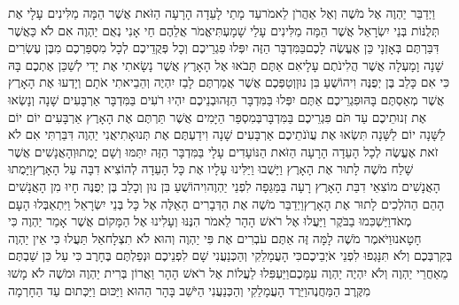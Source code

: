 \documentclass[../main/main.tex]{subfiles}
\begin{document}
\begin{multicols}{\ncols}
וַיְדַבֵּר יַהְוֶה אֶל מֹשֶׁה וְאֶל אַהֲרֹן לֵאמֹר\PreVerseSpace{}עַד מָתַי לָעֵדָה הָרָעָה הַזֹּאת אֲשֶׁר הֵמָּה מַלִּינִים עָלָי אֶת תְּלֻנּוֹת בְּנֵי יִשְׂרָאֵל אֲשֶׁר הֵמָּה מַלִּינִים עָלַי שָׁמָעְתִּי\PreVerseSpace{}אֱמֹר אֲלֵהֶם חַי אָנִי נְאֻם יַהְוֶה אִם לֹא כַּאֲשֶׁר דִּבַּרְתֶּם בְּאָזְנָי כֵּן אֶעֱשֶׂה לָכֶם\PreVerseSpace{}בַּמִּדְבָּר הַזֶּה יִפְּלוּ פִגְרֵיכֶם וְכָל פְּקֻדֵיכֶם לְכָל מִסְפַּרְכֶם מִבֶּן עֶשְׂרִים שָׁנָה וָמָעְלָה אֲשֶׁר הֲלִינֹתֶם עָלָי\PreVerseSpace{}אִם אַתֶּם תָּבֹאוּ אֶל הָאָרֶץ אֲשֶׁר נָשָׂאתִי אֶת יָדִי לְשַׁכֵּן אֶתְכֶם בָּהּ כִּי אִם כָּלֵב בֶּן יְפֻנֶּה וִיהוֹשֻׁעַ בִּן נוּן\PreVerseSpace{}וְטַפְּכֶם אֲשֶׁר אֲמַרְתֶּם לָבַז יִהְיֶה וְהֵבֵיאתִי אֹתָם וְיָדְעוּ אֶת הָאָרֶץ אֲשֶׁר מְאַסְתֶּם בָּהּ\PreVerseSpace{}וּפִגְרֵיכֶם אַתֶּם יִפְּלוּ בַּמִּדְבָּר הַזֶּה\PreVerseSpace{}וּבְנֵיכֶם יִהְיוּ רֹעִים בַּמִּדְבָּר אַרְבָּעִים שָׁנָה וְנָשְׂאוּ אֶת זְנוּתֵיכֶם עַד תֹּם פִּגְרֵיכֶם בַּמִּדְבָּר\PreVerseSpace{}בְּמִסְפַּר הַיָּמִים אֲשֶׁר תַּרְתֶּם אֶת הָאָרֶץ אַרְבָּעִים יוֹם יוֹם לַשָּׁנָה יוֹם לַשָּׁנָה תִּשְׂאוּ אֶת עֲוֺנֹתֵיכֶם אַרְבָּעִים שָׁנָה וִידַעְתֶּם אֶת תְּנוּאָתִי\PreVerseSpace{}אֲנִי יַהְוֶה דִּבַּרְתִּי אִם לֹא זֹאת אֶעֱשֶׂה לְכָל הָעֵדָה הָרָעָה הַזֹּאת הַנּוֹעָדִים עָלָי בַּמִּדְבָּר הַזֶּה יִתַּמּוּ וְשָׁם יָמֻתוּ\PreVerseSpace{}וְהָאֲנָשִׁים אֲשֶׁר שָׁלַח מֹשֶׁה לָתוּר אֶת הָאָרֶץ וַיָּשֻׁבוּ וַיַּלִּינוּ\SubEnd{} עָלָיו אֶת כָּל הָעֵדָה לְהוֹצִיא דִבָּה עַל הָאָרֶץ\PreVerseSpace{}וַיָּמֻתוּ הָאֲנָשִׁים מוֹצִאֵי דִבַּת הָאָרֶץ רָעָה בַּמַּגֵּפָה לִפְנֵי יַהְוֶה\PreVerseSpace{}וִיהוֹשֻׁעַ בִּן נוּן וְכָלֵב בֶּן יְפֻנֶּה חָיוּ מִן הָאֲנָשִׁים הָהֵם הַהֹלְכִים לָתוּר אֶת הָאָרֶץ\PreVerseSpace{}וַיְדַבֵּר מֹשֶׁה אֶת הַדְּבָרִים הָאֵלֶּה אֶל כָּל בְּנֵי יִשְׂרָאֵל וַיִּתְאַבְּלוּ הָעָם מְאֹד\PreVerseSpace{}וַיַּשְׁכִּמוּ בַבֹּקֶר וַיַּעֲלוּ אֶל רֹאשׁ הָהָר לֵאמֹר הִנֶּנּוּ וְעָלִינוּ אֶל הַמָּקוֹם אֲשֶׁר אָמַר יַהְוֶה כִּי חָטָאנוּ\PreVerseSpace{}וַיֹּאמֶר מֹשֶׁה לָמָּה זֶּה אַתֶּם עֹבְרִים אֶת פִּי יַהְוֶה וְהוּא לֹא תִצְלָח\PreVerseSpace{}אַל תַּעֲלוּ כִּי אֵין יַהְוֶה בְּקִרְבְּכֶם וְלֹא תִּנָּגְפוּ לִפְנֵי אֹיְבֵיכֶם\PreVerseSpace{}כִּי הָעֲמָלֵקִי וְהַכְּנַעֲנִי שָׁם לִפְנֵיכֶם וּנְפַלְתֶּם בֶּחָרֶב כִּי עַל כֵּן שַׁבְתֶּם מֵאַחֲרֵי יַהְוֶה וְלֹא יִהְיֶה יַהְוֶה עִמָּכֶם\PreVerseSpace{}וַיַּעְפִּלוּ לַעֲלוֹת אֶל רֹאשׁ הָהָר וַאֲרוֹן בְּרִית יַהְוֶה וּמֹשֶׁה לֹא מָשׁוּ מִקֶּרֶב הַמַּחֲנֶה\PreVerseSpace{}וַיֵּרֶד הָעֲמָלֵקִי וְהַכְּנַעֲנִי הַיֹּשֵׁב בָּהָר הַהוּא וַיַּכּוּם וַיַּכְּתוּם עַד הַחָרְמָה\OpenSection{}\par

\end{multicols}
\end{document}
